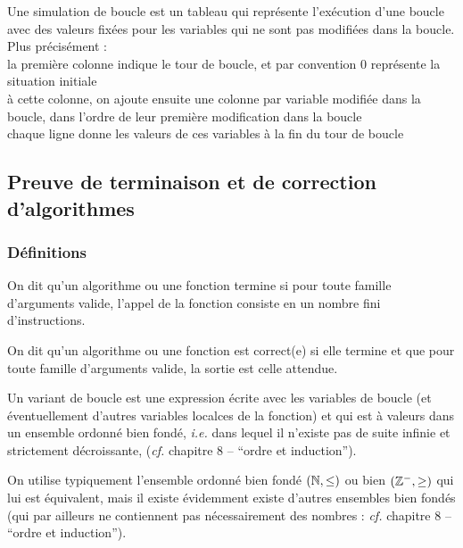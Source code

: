 		\begin{Definition}
			Une simulation de boucle est un tableau qui représente l'exécution d'une boucle avec des valeurs fixées pour les variables qui ne sont pas modifiées dans la boucle. Plus précisément : \\
			 \bdot la première colonne indique le tour de boucle, et par convention 0 représente la situation initiale \\
			 \bdot à cette colonne, on ajoute ensuite une colonne par variable modifiée dans la boucle, dans l'ordre de leur première modification dans la boucle \\
			 \bdot chaque ligne donne les valeurs de ces variables à la fin du tour de boucle
		\end{Definition}
	
	\subsection{Preuve de terminaison et de correction d'algorithmes}
	
		\subsubsection{Définitions}
			
			\begin{Definition}[terminaison]
				On dit qu'un algorithme ou une fonction termine si pour toute famille d'arguments valide, l'appel de la fonction consiste en un nombre fini d'instructions.
			\end{Definition}
		
			\begin{Definition}[correction]
				On dit qu'un algorithme ou une fonction est correct(e) si elle termine et que pour toute famille d'arguments valide, la sortie est celle attendue.
			\end{Definition}
			
			\begin{Definition}
				Un variant de boucle est une expression écrite avec les variables de boucle (et éventuellement d'autres variables localces de la fonction) et qui est à valeurs dans un ensemble ordonné bien fondé, \emph{i.e.} dans lequel il n'existe pas de suite infinie et strictement décroissante, (\emph{cf.} chapitre 8 -- ``ordre et induction'').
			\end{Definition}
				
				\begin{Remarque}
					On utilise typiquement l'ensemble ordonné bien fondé \((\mathbb{N},\leq)\) ou bien \((\mathbb{Z}^-,\geq)\) qui lui est équivalent, mais il existe évidemment existe d'autres ensembles bien fondés (qui par ailleurs ne contiennent pas nécessairement des nombres : \emph{cf.} chapitre 8 -- ``ordre et induction'').
				\end{Remarque}
		

